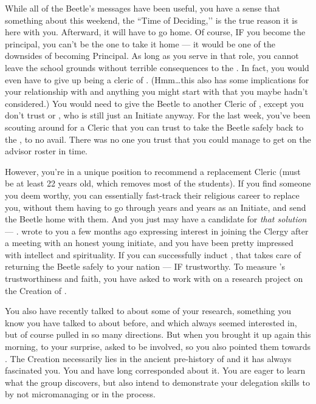 \documentclass[char]{GL2020}
\begin{document}
While all of the Beetle's messages have been useful, you have a sense that something about this weekend, the ``Time of Deciding,’’ is the true reason it is here with you. Afterward, it will have to go home. Of course, IF you become the principal, you can't be the one to take it home — it would be one of the downsides of becoming Principal. As long as you serve in that role, you cannot leave the school grounds without terrible consequences to the \pSc{}. In fact, you would even have to give up being a cleric of \cTechGod{}. (Hmm\ldots this also has some implications for your relationship with \cJuniorStatesman{} and anything you might start with \cEthics{} that you maybe hadn’t considered.) You would need to give the Beetle to another Cleric of \cTechGod{}, except you don't trust \cAntiChup{} or \cScholarship{}, who is still just an Initiate anyway. For the last week, you've been scouting around for a Cleric that you can trust to take the Beetle safely back to the \pTech{}, to no avail. There was no one you trust that you could manage to get on the advisor roster in time. 

However, you're in a unique position to recommend a replacement Cleric (must be at least 22 years old, which removes most of the students). If you find someone you deem worthy, you can essentially fast-track their religious career to replace you, without them having to go through years and years as an Initiate, and send the Beetle home with them. And you just may have a candidate for \emph{that solution} — \cHeadScientist{\intro}. \cHeadScientist{} wrote to you a few months ago expressing interest in joining the Clergy after a meeting with an honest young initiate, and you have been pretty impressed with \cHeadScientist{\their} intellect and spirituality. If you can successfully induct \cHeadScientist{}, that takes care of returning the Beetle safely to your nation — IF \cHeadScientist{\theyare} trustworthy. To measure \cHeadScientist{}'s trustworthiness and faith, you have asked  \cHeadScientist{\them} to work with \cEbbPriest{} on a research project on the Creation of \pEarth{}. 

You also have recently talked to \cLibrarian{\intro} about some of your research, something you know you have talked to \cLibrarian{} about before, and which \cLibrarian{\they} always seemed interested in, but of course pulled in so many directions. But when you brought it up again this morning, to your surprise, \cLibrarian{\they} asked to be involved, so you also pointed them towards \cEbbPriest{}. The Creation necessarily lies in the ancient pre-history of \pEarth{} and it has always fascinated you. You and \cEbbPriest{} have long corresponded about it. You are eager to learn what the group discovers, but also intend to demonstrate your delegation skills to \cPrincipal{} by not micromanaging \cHeadScientist{} or \cLibrarian{} in the process.
\end{document}
